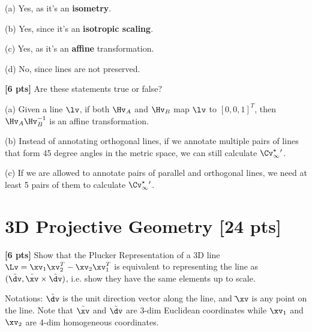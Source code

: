 \documentclass[11pt]{exam}
\numberwithin{equation}{section} %
\numberwithin{figure}{section} %
\numberwithin{table}{section} %
\begin{document}
\begin{questions}
    \begin{tcolorbox}[height fill, width=\textwidth, blank, borderline={0.5pt}{-2pt},halign=left, valign=top, nobeforeafter, size=normal]
        (a) Yes, as it's an \textbf{isometry}.

        (b) Yes, since it's an \textbf{isotropic scaling}.

        (c) Yes, as it's an \textbf{affine} transformation.

        (d) No, since lines are not preserved.
    \end{tcolorbox}

    \question \textbf{[6 pts]} Are these statements true or false?

    (a) Given a line $\lv$, if both $\Hv_A$ and $\Hv_B$ map $\lv$ to $[0,0,1]^T$, then $\Hv_A\Hv_B^{-1}$ is an affine transformation.

    (b) Instead of annotating orthogonal lines, if we annotate multiple pairs of lines that form 45 degree angles in the metric space, we can still calculate $\Cv_\infty^{\star}{}'$.

    (c) If we are allowed to annotate pairs of parallel and orthogonal lines, we need at least 5 pairs of them to calculate $\Cv_\infty^{\star}{}'$.

    \begin{tcolorbox}[height fill, width=\textwidth, blank, borderline={0.5pt}{-2pt},halign=left, valign=top, nobeforeafter, size=normal]

    \end{tcolorbox}

    \section{3D Projective Geometry [24 pts]}

    \question \textbf{[6 pts]} Show that the Plucker Representation of a 3D line $\Lv = \xv_1\xv_2^T - \xv_2\xv_1^T$ is equivalent to representing the line as $(\tilde \dv, \tilde \xv \times \tilde \dv)$, i.e. show they have the same elements up to scale.

    Notations: $\tilde\dv$ is the unit direction vector along the line, and $\tilde{}
        \xv$ is any point on the line. Note that $\tilde\xv$ and $\tilde\dv$ are 3-dim
    Euclidean coordinates while $\xv_1$ and $\xv_2$ are 4-dim homogeneous
    coordinates.

    \begin{tcolorbox}[height fill, width=\textwidth, blank, borderline={0.5pt}{-2pt},halign=left, valign=top, nobeforeafter, size=normal]


\end{tcolorbox}
\end{questions}
\end{document}
